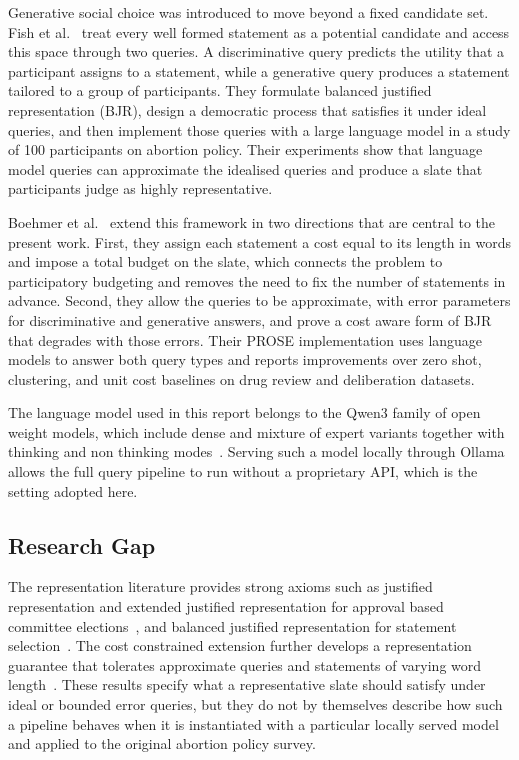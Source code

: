 \documentclass[letterpaper,11pt]{article}
\theoremstyle{plain}
\theoremstyle{definition}
\begin{document}
Generative social choice was introduced to move beyond a fixed candidate set. Fish et al.~\citep{fish2026gsc} treat every well formed statement as a potential candidate and access this space through two queries. A discriminative query predicts the utility that a participant assigns to a statement, while a generative query produces a statement tailored to a group of participants. They formulate balanced justified representation (BJR), design a democratic process that satisfies it under ideal queries, and then implement those queries with a large language model in a study of 100 participants on abortion policy. Their experiments show that language model queries can approximate the idealised queries and produce a slate that participants judge as highly representative.

Boehmer et al.~\citep{boehmer2025nextgen} extend this framework in two directions that are central to the present work. First, they assign each statement a cost equal to its length in words and impose a total budget on the slate, which connects the problem to participatory budgeting and removes the need to fix the number of statements in advance. Second, they allow the queries to be approximate, with error parameters for discriminative and generative answers, and prove a cost aware form of BJR that degrades with those errors. Their PROSE implementation uses language models to answer both query types and reports improvements over zero shot, clustering, and unit cost baselines on drug review and deliberation datasets.

The language model used in this report belongs to the Qwen3 family of open weight models, which include dense and mixture of expert variants together with thinking and non thinking modes~\citep{yang2025qwen3}. Serving such a model locally through Ollama~\citep{ollama2026} allows the full query pipeline to run without a proprietary API, which is the setting adopted here.

\subsection{Research Gap}

The representation literature provides strong axioms such as justified representation and extended justified representation for approval based committee elections~\citep{aziz2017jr}, and balanced justified representation for statement selection~\citep{fish2026gsc}. The cost constrained extension further develops a representation guarantee that tolerates approximate queries and statements of varying word length~\citep{boehmer2025nextgen}. These results specify what a representative slate should satisfy under ideal or bounded error queries, but they do not by themselves describe how such a pipeline behaves when it is instantiated with a particular locally served model and applied to the original abortion policy survey.
\end{document}
